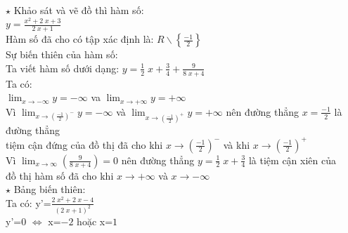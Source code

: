 \documentclass[17pt]{extarticle}
\begin{document}
\everymath{\displaystyle}
$\star$ Khảo sát và vẽ đồ thì hàm số: \\
$y=\frac{x^{2} + 2 \; x + 3}{2 \; x + 1}$\\
 Hàm số đã cho có tập xác định là: $R\backslash\left\{\frac{-1}{2}\right\}$\\
 Sự biến thiên của hàm số:\\
	Ta viết hàm số dưới dạng: $y=\frac{1}{2} \; x + \frac{3}{4}+\frac{9}{8 \; x + 4}$\\
 Ta có: \\
$\lim_{x\to -\infty }y=-\infty$ va $\lim_{x\to+\infty }y=+\infty$\\
 Vì $\lim_{x\to(\frac{-1}{2})^{-} }y=-\infty$ và $\lim_{x\to(\frac{-1}{2})^{+} }y=+\infty$ nên đường thẳng $x=\frac{-1}{2}$ là đường thẳng\\
tiệm cận đứng của đồ thị đã cho khi $x\to(\frac{-1}{2})^{-}$ và khi $x\to(\frac{-1}{2})^{+}$\\
 Vì $\lim_{x\to\infty}(\frac{9}{8 \; x + 4})=0$ nên đường thẳng $y=\frac{1}{2} \; x + \frac{3}{4}$ là tiệm cận xiên của\\
 đồ thị hàm số đã cho khi $x\to+\infty$ và $x\to-\infty$\\
$\star$ Bảng biến thiên:\\
 Ta có: y'=$\frac{2 \; x^{2} + 2 \; x - 4}{\left(2 \; x + 1\right)^{2}}$ \\
	y'=0 $\Leftrightarrow$ x=$-2$ hoặc x=$1$ \\
\end{document}
